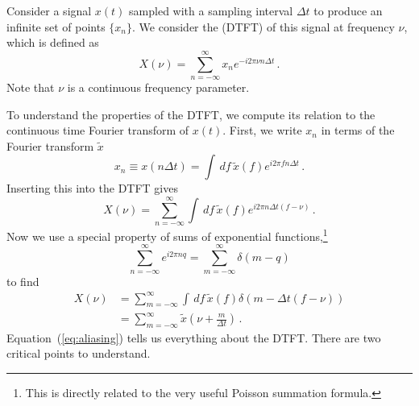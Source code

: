 Consider a signal $x(t)$ sampled with a sampling interval $\Delta t$ to produce an infinite set of points $\{ x_n \}$.
We consider the  (DTFT) of this signal at frequency $\nu$, which is defined as
\begin{equation}
X(\nu) =\sum_{n=-\infty}^\infty x_n e^{-i 2\pi \nu n \Delta t} \, .
\end{equation}
Note that $\nu$ is a continuous frequency parameter.

To understand the properties of the DTFT, we compute its relation to the continuous time Fourier transform of $x(t)$.
First, we write $x_n$ in terms of the Fourier transform $\tilde{x}$
\begin{equation}
x_n \equiv x(n \Delta t) = \int \, df \, \tilde{x}(f) e^{i 2 \pi f n \Delta t} \, .
\end{equation}
Inserting this into the DTFT gives
\begin{equation}
X(\nu) = \sum_{n=-\infty}^\infty \int \, df \,
\tilde{x}(f) e^{i 2 \pi n \Delta t (f - \nu)} \, .
\end{equation}
Now we use a special property of sums of exponential functions,\footnote{This is directly related to the very useful Poisson summation formula.}
\begin{equation}
\sum_{n=-\infty}^\infty e^{i 2 \pi n q} =
\sum_{m=-\infty}^\infty \delta (m - q)
\end{equation}
to find
\begin{align}
X(\nu)
&= \sum_{m=-\infty}^\infty \int \, df \, \tilde{x}(f) \delta( m - \Delta t (f - \nu) ) \nonumber \\
  &= \sum_{m=-\infty}^\infty \tilde{x} \left( \nu + \frac{m}{\Delta t} \right) \, . \label{eq:aliasing}
\end{align}
Equation~(\ref{eq:aliasing}) tells us everything about the DTFT.
There are two critical points to understand.

